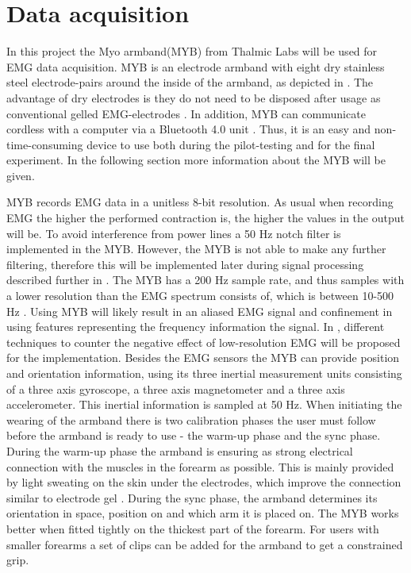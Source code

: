 \section{Data acquisition} \label{sec:MYB}
In this project the Myo armband(MYB) from Thalmic Labs will be used for EMG data acquisition. MYB is an electrode armband with eight dry stainless steel electrode-pairs around the inside of the armband, as depicted in . The advantage of dry electrodes is they do not need to be disposed after usage as conventional gelled EMG-electrodes \cite{Cram2012}. In addition, MYB can communicate cordless with a computer via a Bluetooth 4.0 unit \cite{Myoarmband2013}. Thus, it is an easy and non-time-consuming device to use both during the pilot-testing and for the final experiment. In the following section more information about the MYB will be given.

MYB records EMG data in a unitless 8-bit resolution. As usual when recording EMG the higher the performed contraction is, the higher the values in the output will be. To avoid interference from power lines a 50 Hz notch filter is implemented in the MYB. However, the MYB is not able to make any further filtering, therefore this will be implemented later during signal processing described further in . The MYB has a 200 Hz sample rate, and thus samples with a lower resolution than the EMG spectrum consists of, which is between 10-500 Hz \cite{Cram2012}. Using MYB will likely result in an aliased EMG signal and confinement in using features representing the frequency information the signal. In , different techniques to counter the negative effect of low-resolution EMG will be proposed for the implementation. 
Besides the EMG sensors the MYB can provide position and orientation information, using its three inertial measurement units consisting of a three axis gyroscope, a three axis magnetometer and a three axis accelerometer. This inertial information is sampled at 50 Hz. \cite{Myoarmband2013} When initiating the wearing of the armband there is two calibration phases the user must follow before the armband is ready to use - the warm-up phase and the sync phase. During the warm-up phase the armband is ensuring as strong electrical connection with the muscles in the forearm as possible. This is mainly provided by light sweating on the skin under the electrodes, which improve the connection similar to electrode gel \cite{Cram2012}. During the sync phase, the armband determines its orientation in space, position on and which arm it is placed on. The MYB works better when fitted tightly on the thickest part of the forearm. For users with smaller forearms a set of clips can be added for the armband to get a constrained grip. \cite{Myoarmband2013}

